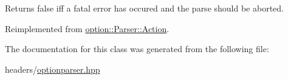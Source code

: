 Returns {\ttfamily false} iff a fatal error has occured and the parse should be aborted. 

Reimplemented from \hyperlink{structoption_1_1Parser_1_1Action_a176b5f783bb35eb015b6d2c09422457d}{option\+::\+Parser\+::\+Action}.



The documentation for this class was generated from the following file\+:\begin{DoxyCompactItemize}
\item 
headers/\hyperlink{optionparser_8hpp}{optionparser.\+hpp}\end{DoxyCompactItemize}
